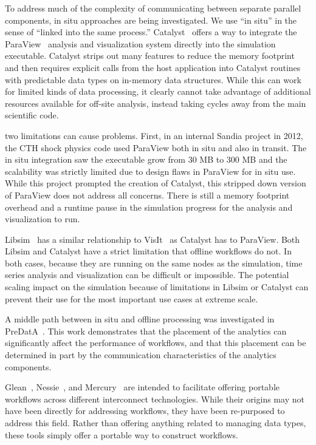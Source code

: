 To address much of the complexity of communicating between separate parallel
components, in situ approaches are being investigated.
We use ``in situ'' in the sense of ``linked into the same process.''
Catalyst~\cite{karimabadi:2013:catalyst} offers a way to integrate the
ParaView~\cite{Moreland:2008:paraview} analysis and visualization system
directly into the simulation executable. Catalyst strips out many features to
reduce the memory footprint and then requires explicit calls from the host
application into Catalyst routines with predictable data types on in-memory
data structures. While this can work for limited kinds of data processing,
it clearly cannot take advantage of additional resources
available for off-site analysis, instead taking cycles
away from the main scientific code.

two
limitations can cause problems. First, in an internal Sandia project in 2012,
the CTH shock physics code used ParaView both in situ and also in transit. The
in situ integration saw the executable grow from 30 MB to 300 MB and the
scalability was strictly limited due to design flaws in ParaView for in situ
use. While this project prompted the creation of Catalyst, this stripped down
version of ParaView does not address all concerns. There is still a memory
footprint overhead and a runtime pause in the simulation progress for the
analysis and visualization to run.
\fi

Libsim~\cite{whitlock:2011:libsim} has a similar relationship to
VisIt~\cite{Riedel:2007:visit} as Catalyst has to ParaView. Both Libsim and
Catalyst have a strict limitation that offline workflows do not. In both cases,
because they are running on the same nodes as the simulation, time series
analysis and visualization can be difficult or impossible. The potential
scaling impact on the simulation because of limitations in Libsim or Catalyst
can prevent their use for the most important use cases at extreme scale.

A middle path between in situ and offline processing was investigated in
PreDatA~\cite{zheng:2010:predata}.
This work demonstrates that the placement of the analytics can significantly
affect the performance of workflows, and that this placement can be determined
in part by the communication characteristics of the analytics components.

Glean~\cite{vishwanath:2011:glean}, Nessie~\cite{oldfield:lwfs-data-movement},
and Mercury~\cite{Soumagne:2013:mercury} are intended to facilitate offering
portable workflows across different interconnect technologies. While their
origins may not have been directly for addressing workflows, they have been
re-purposed to address this field. Rather than offering anything related to
managing data types, these tools simply offer a portable way to construct
workflows.
\fi

